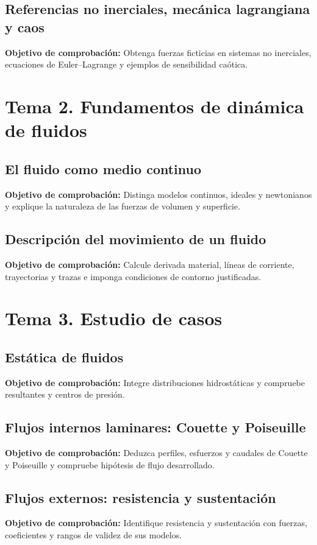 \documentclass[10pt,openany]{book}
\begin{document}
\subsection*{Referencias no inerciales, mecánica lagrangiana y caos}
\noindent \textbf{Objetivo de comprobación:} Obtenga fuerzas ficticias en sistemas no inerciales, ecuaciones de Euler--Lagrange y ejemplos de sensibilidad caótica.

\section*{Tema 2. Fundamentos de dinámica de fluidos}

\subsection*{El fluido como medio continuo}
\noindent \textbf{Objetivo de comprobación:} Distinga modelos continuos, ideales y newtonianos y explique la naturaleza de las fuerzas de volumen y superficie.

\subsection*{Descripción del movimiento de un fluido}
\noindent \textbf{Objetivo de comprobación:} Calcule derivada material, líneas de corriente, trayectorias y trazas e imponga condiciones de contorno justificadas.

\section*{Tema 3. Estudio de casos}

\subsection*{Estática de fluidos}
\noindent \textbf{Objetivo de comprobación:} Integre distribuciones hidrostáticas y compruebe resultantes y centros de presión.

\subsection*{Flujos internos laminares: Couette y Poiseuille}
\noindent \textbf{Objetivo de comprobación:} Deduzca perfiles, esfuerzos y caudales de Couette y Poiseuille y compruebe hipótesis de flujo desarrollado.

\subsection*{Flujos externos: resistencia y sustentación}
\noindent \textbf{Objetivo de comprobación:} Identifique resistencia y sustentación con fuerzas, coeficientes y rangos de validez de sus modelos.
\end{document}
